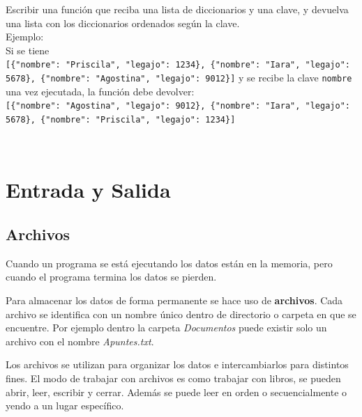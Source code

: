 \documentclass[
  letterpaper,
  DIV=11,
  numbers=noendperiod]{scrreprt}
\begin{document}
\begin{tcolorbox}[enhanced jigsaw, arc=.35mm, toptitle=1mm, colframe=quarto-callout-important-color-frame, bottomtitle=1mm, opacitybacktitle=0.6, colbacktitle=quarto-callout-important-color!10!white, leftrule=.75mm, coltitle=black, toprule=.15mm, titlerule=0mm, title=\textcolor{quarto-callout-important-color}{\faExclamation}\hspace{0.5em}{Ejercicio Desafío}, bottomrule=.15mm, rightrule=.15mm, colback=white, breakable, opacityback=0, left=2mm]

Escribir una función que reciba una lista de diccionarios y una clave, y
devuelva una lista con los diccionarios ordenados según la clave.\\

Ejemplo:\\
Si se tiene
\texttt{{[}\{"nombre":\ "Priscila",\ "legajo":\ 1234\},\ \{"nombre":\ "Iara",\ "legajo":\ 5678\},\ \{"nombre":\ "Agostina",\ "legajo":\ 9012\}{]}}
y se recibe la clave \texttt{nombre}\\
una vez ejecutada, la función debe devolver:\\
\texttt{{[}\{"nombre":\ "Agostina",\ "legajo":\ 9012\},\ \{"nombre":\ "Iara",\ "legajo":\ 5678\},\ \{"nombre":\ "Priscila",\ "legajo":\ 1234\}{]}}\strut \\

\end{tcolorbox}


\chapter{Entrada y Salida}\label{entrada-y-salida}

\section{Archivos}\label{archivos}

Cuando un programa se está ejecutando los datos están en la memoria,
pero cuando el programa termina los datos se pierden.

Para almacenar los datos de forma permanente se hace uso de
\textbf{archivos}. Cada archivo se identifica con un nombre único dentro
de directorio o carpeta en que se encuentre. Por ejemplo dentro la
carpeta \emph{Documentos} puede existir solo un archivo con el nombre
\emph{Apuntes.txt}.

Los archivos se utilizan para organizar los datos e intercambiarlos para
distintos fines. El modo de trabajar con archivos es como trabajar con
libros, se pueden abrir, leer, escribir y cerrar. Además se puede leer
en orden o secuencialmente o yendo a un lugar específico.
\end{document}
